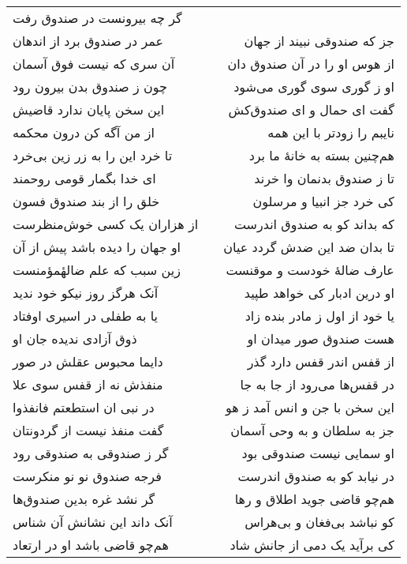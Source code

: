 \begin{center}
\begin{longtable}{l p{0.5cm} r}
گر چه بیرونست در صندوق رفت
\\
عمر در صندوق برد از اندهان
&&
جز که صندوقی نبیند از جهان
\\
آن سری که نیست فوق آسمان
&&
از هوس او را در آن صندوق دان
\\
چون ز صندوق بدن بیرون رود
&&
او ز گوری سوی گوری می‌شود
\\
این سخن پایان ندارد قاضیش
&&
گفت ای حمال و ای صندوق‌کش
\\
از من آگه کن درون محکمه
&&
نایبم را زودتر با این همه
\\
تا خرد این را به زر زین بی‌خرد
&&
هم‌چنین بسته به خانهٔ ما برد
\\
ای خدا بگمار قومی روحمند
&&
تا ز صندوق بدنمان وا خرند
\\
خلق را از بند صندوق فسون
&&
کی خرد جز انبیا و مرسلون
\\
از هزاران یک کسی خوش‌منظرست
&&
که بداند کو به صندوق اندرست
\\
او جهان را دیده باشد پیش از آن
&&
تا بدان ضد این ضدش گردد عیان
\\
زین سبب که علم ضالهٔمؤمنست
&&
عارف ضالهٔ خودست و موقنست
\\
آنک هرگز روز نیکو خود ندید
&&
او درین ادبار کی خواهد طپید
\\
یا به طفلی در اسیری اوفتاد
&&
یا خود از اول ز مادر بنده زاد
\\
ذوق آزادی ندیده جان او
&&
هست صندوق صور میدان او
\\
دایما محبوس عقلش در صور
&&
از قفس اندر قفس دارد گذر
\\
منفذش نه از قفس سوی علا
&&
در قفس‌ها می‌رود از جا به جا
\\
در نبی ان استطعتم فانفذوا
&&
این سخن با جن و انس آمد ز هو
\\
گفت منفذ نیست از گردونتان
&&
جز به سلطان و به وحی آسمان
\\
گر ز صندوقی به صندوقی رود
&&
او سمایی نیست صندوقی بود
\\
فرجه صندوق نو نو منکرست
&&
در نیابد کو به صندوق اندرست
\\
گر نشد غره بدین صندوق‌ها
&&
هم‌چو قاضی جوید اطلاق و رها
\\
آنک داند این نشانش آن شناس
&&
کو نباشد بی‌فغان و بی‌هراس
\\
هم‌چو قاضی باشد او در ارتعاد
&&
کی برآید یک دمی از جانش شاد
\\
\end{longtable}
\end{center}
